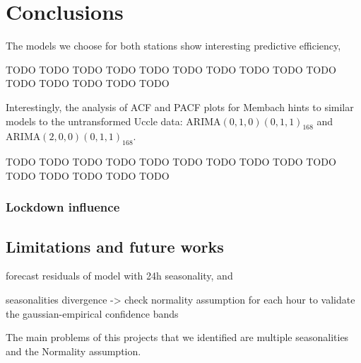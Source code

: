 \documentclass[12pt]{article}
\begin{document}





\section{Conclusions}
The models we choose for both stations show interesting predictive efficiency, 

TODO TODO TODO TODO TODO TODO TODO TODO TODO TODO TODO TODO TODO TODO TODO 

Interestingly, the analysis of ACF and PACF plots for Membach hints to similar models to the untransformed Uccle data:
$\mathrm{ARIMA}(0,1,0)(0,1,1)_{168}$ and $\mathrm{ARIMA}(2,0,0)(0,1,1)_{168}$.

TODO TODO TODO TODO TODO TODO TODO TODO TODO TODO TODO TODO TODO TODO TODO 

\subsubsection{Lockdown influence}
\subsection{Limitations and future works}
forecast residuals of model with 24h seasonality, and 

seasonalities divergence -> check normality assumption for each hour to validate the gaussian-empirical confidence bands

The main problems of this projects that we identified are multiple seasonalities and the Normality assumption.

\end{document}

